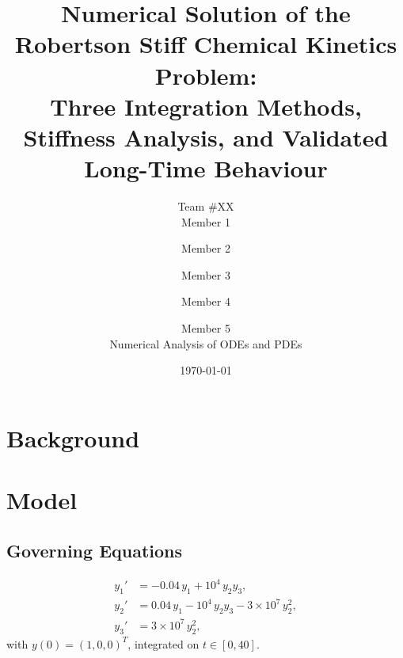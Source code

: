 \documentclass[11pt]{article}
\title{Numerical Solution of the Robertson Stiff Chemical Kinetics Problem:\\
Three Integration Methods, Stiffness Analysis, and Validated Long-Time Behaviour}
\author{
  Team \#XX \\
  Member 1 \and Member 2 \and Member 3 \and Member 4 \and Member 5 \\
  \small Numerical Analysis of ODEs and PDEs
}
\date{\today}
\begin{document}
\maketitle

\begin{abstract}
\end{abstract}

\tableofcontents
\newpage

\section{Background}

\section{Model}

\subsection{Governing Equations}
\begin{align}
  y_1' &= -0.04\, y_1 + 10^4\, y_2 y_3, \\
  y_2' &= 0.04\, y_1 - 10^4\, y_2 y_3 - 3\times 10^7\, y_2^2, \\
  y_3' &= 3\times 10^7\, y_2^2,
\end{align}
with $y(0) = (1,0,0)^T$, integrated on $t \in [0,40]$.
\end{document}
